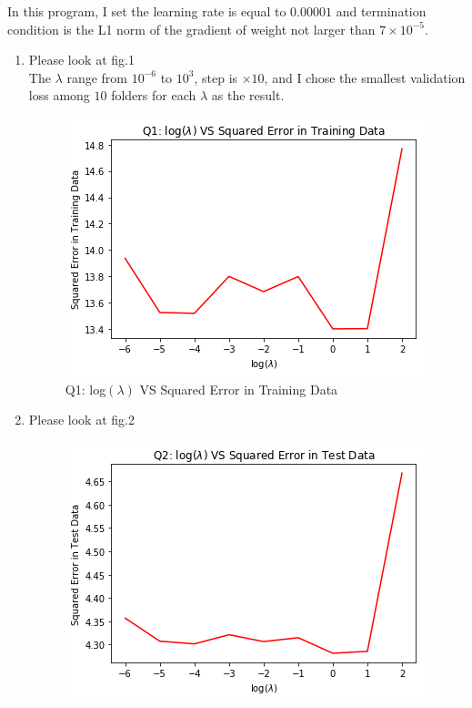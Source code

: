 \documentclass{article}
\begin{document}

In this program, I set the learning rate is equal to $0.00001$ and termination condition is the L1 norm of the gradient of weight not larger than $7\times 10^{-5}$.
\begin{enumerate}[(1)]
\item
Please look at fig.1\\ 
The $\lambda$ range from $10^{-6}$ to $10^{3}$, step is $\times 10$, and I chose the smallest validation loss among $10$ folders for each $\lambda$ as the result.
\begin{figure}
\centering
        \includegraphics[totalheight=8cm]{q1.png}
    \caption{Q1: log$(\lambda)$ VS Squared Error in Training Data}
    \label{fig:verticalcell}
\end{figure}
\item 
Please look at fig.2
\begin{figure}
\centering
        \includegraphics[totalheight=8cm]{q2.png}

\end{figure}
\end{enumerate}
\end{document}
